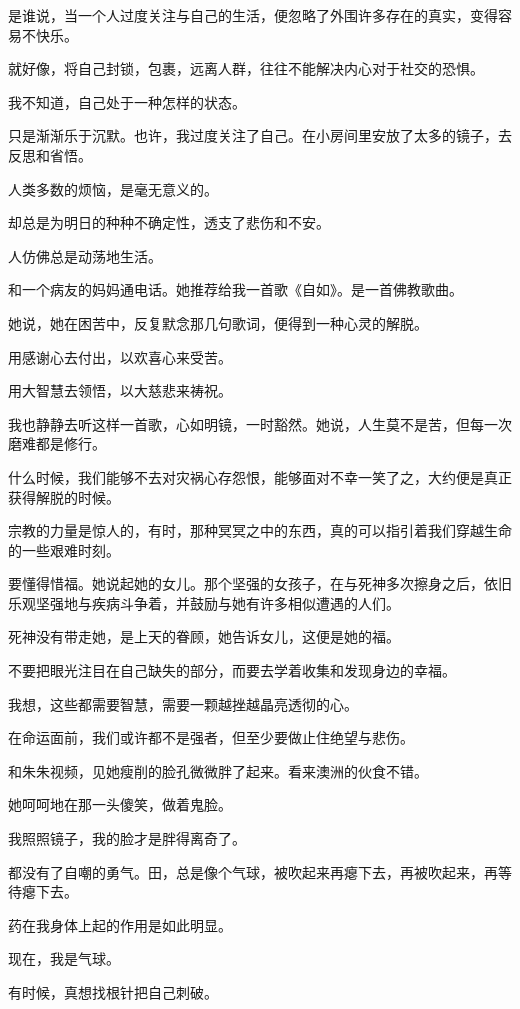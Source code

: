	\endwriting



		是谁说，当一个人过度关注与自己的生活，便忽略了外围许多存在的真实，变得容易不快乐。\par
		就好像，将自己封锁，包裹，远离人群，往往不能解决内心对于社交的恐惧。\par
		我不知道，自己处于一种怎样的状态。\par
		只是渐渐乐于沉默。也许，我过度关注了自己。在小房间里安放了太多的镜子，去反思和省悟。\par
		人类多数的烦恼，是毫无意义的。\par
		却总是为明日的种种不确定性，透支了悲伤和不安。\par
		人仿佛总是动荡地生活。


		和一个病友的妈妈通电话。她推荐给我一首歌《自如》。是一首佛教歌曲。\par
		她说，她在困苦中，反复默念那几句歌词，便得到一种心灵的解脱。

		用感谢心去付出，以欢喜心来受苦。\par
		用大智慧去领悟，以大慈悲来祷祝。

		我也静静去听这样一首歌，心如明镜，一时豁然。她说，人生莫不是苦，但每一次磨难都是修行。\par
		什么时候，我们能够不去对灾祸心存怨恨，能够面对不幸一笑了之，大约便是真正获得解脱的时候。\par
		宗教的力量是惊人的，有时，那种冥冥之中的东西，真的可以指引着我们穿越生命的一些艰难时刻。\par
		要懂得惜福。她说起她的女儿。那个坚强的女孩子，在与死神多次擦身之后，依旧乐观坚强地与疾病斗争着，并鼓励与她有许多相似遭遇的人们。\par
		死神没有带走她，是上天的眷顾，她告诉女儿，这便是她的福。\par
		不要把眼光注目在自己缺失的部分，而要去学着收集和发现身边的幸福。\par
		我想，这些都需要智慧，需要一颗越挫越晶亮透彻的心。\par
		在命运面前，我们或许都不是强者，但至少要做止住绝望与悲伤。

		和朱朱视频，见她瘦削的脸孔微微胖了起来。看来澳洲的伙食不错。\par
		她呵呵地在那一头傻笑，做着鬼脸。\par
		我照照镜子，我的脸才是胖得离奇了。\par
		都没有了自嘲的勇气。田，总是像个气球，被吹起来再瘪下去，再被吹起来，再等待瘪下去。\par
		药在我身体上起的作用是如此明显。\par
		现在，我是气球。\par
		有时候，真想找根针把自己刺破。

